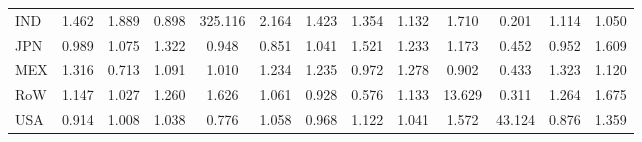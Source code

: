 \begin{table}[htbp]
\begin{tabular}{lcccccccccccc}
  IND & \textcolor[RGB]{40,26,215}{1.462} & \textcolor[RGB]{13,8,242}{1.889} & \textcolor[RGB]{210,136,45}{0.898} & \textcolor[RGB]{0,0,255}{325.116} & \textcolor[RGB]{11,7,244}{2.164} & \textcolor[RGB]{45,29,210}{1.423} & \textcolor[RGB]{53,34,202}{1.354} & \textcolor[RGB]{121,78,134}{1.132} & \textcolor[RGB]{15,10,240}{1.710} & \textcolor[RGB]{253,164,2}{0.201} & \textcolor[RGB]{130,84,125}{1.114} & \textcolor[RGB]{153,99,102}{1.050} \\ 
  JPN & \textcolor[RGB]{183,118,72}{0.989} & \textcolor[RGB]{142,92,113}{1.075} & \textcolor[RGB]{59,38,196}{1.322} & \textcolor[RGB]{195,126,60}{0.948} & \textcolor[RGB]{217,140,38}{0.851} & \textcolor[RGB]{155,100,100}{1.041} & \textcolor[RGB]{36,23,219}{1.521} & \textcolor[RGB]{89,58,166}{1.233} & \textcolor[RGB]{102,66,153}{1.173} & \textcolor[RGB]{240,155,15}{0.452} & \textcolor[RGB]{193,125,62}{0.952} & \textcolor[RGB]{28,18,227}{1.609} \\ 
  MEX & \textcolor[RGB]{62,40,193}{1.316} & \textcolor[RGB]{232,150,23}{0.713} & \textcolor[RGB]{140,91,115}{1.091} & \textcolor[RGB]{168,109,87}{1.010} & \textcolor[RGB]{87,56,168}{1.234} & \textcolor[RGB]{85,55,170}{1.235} & \textcolor[RGB]{185,120,70}{0.972} & \textcolor[RGB]{68,44,187}{1.278} & \textcolor[RGB]{208,135,47}{0.902} & \textcolor[RGB]{242,157,13}{0.433} & \textcolor[RGB]{57,37,198}{1.323} & \textcolor[RGB]{128,82,128}{1.120} \\ 
  RoW & \textcolor[RGB]{110,72,144}{1.147} & \textcolor[RGB]{164,106,91}{1.027} & \textcolor[RGB]{81,52,174}{1.260} & \textcolor[RGB]{23,15,232}{1.626} & \textcolor[RGB]{147,95,108}{1.061} & \textcolor[RGB]{202,131,53}{0.928} & \textcolor[RGB]{236,153,19}{0.576} & \textcolor[RGB]{119,77,136}{1.133} & \textcolor[RGB]{8,5,246}{13.629} & \textcolor[RGB]{249,161,6}{0.311} & \textcolor[RGB]{77,50,178}{1.264} & \textcolor[RGB]{17,11,238}{1.675} \\ 
  USA & \textcolor[RGB]{206,133,49}{0.914} & \textcolor[RGB]{172,111,83}{1.008} & \textcolor[RGB]{159,103,96}{1.038} & \textcolor[RGB]{230,148,26}{0.776} & \textcolor[RGB]{149,96,106}{1.058} & \textcolor[RGB]{191,124,64}{0.968} & \textcolor[RGB]{123,80,132}{1.122} & \textcolor[RGB]{157,102,98}{1.041} & \textcolor[RGB]{34,22,221}{1.572} & \textcolor[RGB]{4,3,251}{43.124} & \textcolor[RGB]{215,139,40}{0.876} & \textcolor[RGB]{51,33,204}{1.359} \\ 
   \hline
\end{tabular}
\end{table}

